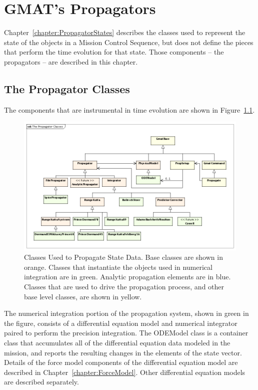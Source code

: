 \chapter{\label{chapter:Propagators}GMAT's Propagators}

Chapter~\ref{chapter:PropagatorStates} describes the classes used to represent the state of the
objects in a Mission Control Sequence, but does not define the pieces that perform the time
evolution for that state.  Those components -- the propagators -- are described in this chapter.

\section{The Propagator Classes}

The components that are instrumental in time evolution are shown in
Figure~\ref{figure:PropagatorClasses}.

\begin{figure}[htb]
\begin{center}
\includegraphics[450,293]{Images/ThePropagatorClasses.png}
\caption[Classes Used to Propagate State Data]{\label{figure:PropagatorClasses}Classes Used
to Propagate State Data.  Base classes are shown in orange.  Classes that instantiate the objects
used in numerical integration are in green.  Analytic propagation elements are in blue.  Classes
that are used to drive the propagation process, and other base level classes, are shown in yellow.}
\end{center}
\end{figure}

The numerical integration portion of the propagation system, shown in green in the figure, consists
of a differential equation model and numerical integrator paired to perform the precision
integration. The ODEModel class is a container class that accumulates all of the differential
equation data modeled in the mission, and reports the resulting changes in the elements of the
state vector. Details of the force model components of the differential equation model are described
in Chapter~\ref{chapter:ForceModel}.  Other differential equation models are described separately.

